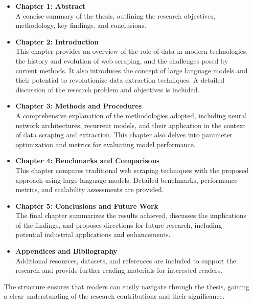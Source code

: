 \begin{itemize}
    \item \textbf{Chapter 1: Abstract} \\
    A concise summary of the thesis, outlining the research objectives, methodology, key findings, and conclusions.

    \item \textbf{Chapter 2: Introduction} \\
    This chapter provides an overview of the role of data in modern technologies, the history and evolution of web scraping, and the challenges posed by current methods. It also introduces the concept of large language models and their potential to revolutionize data extraction techniques. A detailed discussion of the research problem and objectives is included.

    \item \textbf{Chapter 3: Methods and Procedures} \\
    A comprehensive explanation of the methodologies adopted, including neural network architectures, recurrent models, and their application in the context of data scraping and extraction. This chapter also delves into parameter optimization and metrics for evaluating model performance.

    \item \textbf{Chapter 4: Benchmarks and Comparisons} \\
    This chapter compares traditional web scraping techniques with the proposed approach using large language models. Detailed benchmarks, performance metrics, and scalability assessments are provided.

    \item \textbf{Chapter 5: Conclusions and Future Work} \\
    The final chapter summarizes the results achieved, discusses the implications of the findings, and proposes directions for future research, including potential industrial applications and enhancements.

    \item \textbf{Appendices and Bibliography} \\
    Additional resources, datasets, and references are included to support the research and provide further reading materials for interested readers.
\end{itemize}

The structure ensures that readers can easily navigate through the thesis, gaining a clear understanding of the research contributions and their significance.

